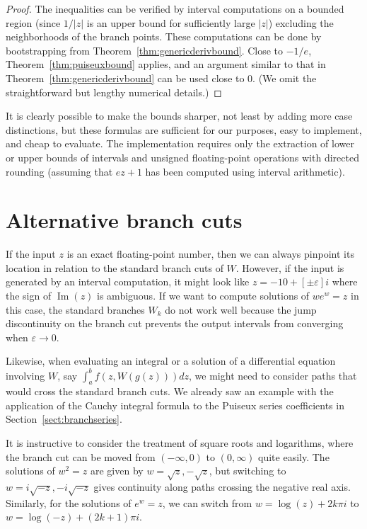 \documentclass[11pt,a4paper]{article}
\begin{document}
\begin{proof}
The inequalities can be verified by interval computations on a bounded
region (since $1/|z|$ is an upper bound for sufficiently large $|z|$)
excluding the neighborhoods of the branch points.
These computations can be done by
bootstrapping from Theorem~\ref{thm:genericderivbound}.
Close to $-1/e$, Theorem~\ref{thm:puiseuxbound} applies, and
an argument similar to that in Theorem~\ref{thm:genericderivbound}
can be used close to 0. (We omit the straightforward
but lengthy numerical details.)
\end{proof}

It is clearly possible to make the bounds sharper,
not least by adding more case distinctions, but these formulas
are sufficient for our purposes, easy to implement, and cheap to evaluate.
The implementation requires only
the extraction of lower or upper bounds of intervals
and unsigned floating-point operations with directed rounding
(assuming that $ez+1$ has been computed using interval arithmetic).

\section{Alternative branch cuts}

\label{sect:altbranch}

If the input $z$ is an exact floating-point number,
then we can always pinpoint its location in relation to the
standard branch cuts of $W$.
However, if the input is generated by an interval computation, it might look
like $z = -10 + [\pm \varepsilon] i$ where
the sign of $\operatorname{Im}(z)$ is ambiguous.
If we want to compute solutions of $w e^w = z$ in this case,
the standard branches $W_k$ do not work well because the jump
discontinuity on the branch cut prevents the output
intervals from converging when $\varepsilon \to 0$.

Likewise, when evaluating an integral or a solution of a differential
equation involving $W$, say
$\int_a^b f(z, W(g(z))) dz$, we might need to consider paths that would cross
the standard branch cuts.
We already saw an example with the application of
the Cauchy integral formula to the Puiseux series
coefficients in Section~\ref{sect:branchseries}.

It is instructive to consider the treatment of square roots and logarithms,
where the branch cut can be moved from $(-\infty,0)$ to $(0,\infty)$ quite easily.
The solutions of $w^2 = z$ are given by $w = \sqrt{z}, -\sqrt{z}$, but
switching to $w = i \sqrt{-z}, -i \sqrt{-z}$ gives continuity
along paths crossing the negative real axis.
Similarly, for the solutions of $e^w = z$, we can switch from
$w = \log(z) + 2k \pi i$ to $w = \log(-z) + (2k+1) \pi i$.
\end{document}
